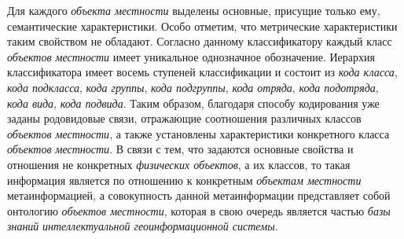 Для каждого \textit{объекта местности} выделены основные, присущие только ему, семантические характеристики. Особо отметим, что метрические характеристики таким свойством не обладают.  
Согласно данному классификатору каждый класс \textit{объектов местности} имеет уникальное однозначное обозначение. Иерархия классификатора имеет восемь ступеней классификации и состоит из \textit{кода класса}, \textit{кода подкласса}, \textit{кода группы}, \textit{кода подгруппы}, \textit{кода отряда}, \textit{кода подотряда}, \textit{кода вида}, \textit{кода подвида}. Таким образом, благодаря способу кодирования уже заданы родовидовые связи, отражающие соотношения различных классов \textit{объектов местности}, а также установлены характеристики конкретного класса \textit{объектов местности}. В связи с тем, что задаются основные свойства и отношения не конкретных \textit{физических объектов}, а их классов, то такая информация является по отношению к конкретным \textit{объектам местности} метаинформацией, а совокупность данной метаинформации представляет собой онтологию \textit{объектов местности}, которая в свою очередь является частью \textit{базы знаний} \textit{интеллектуальной геоинформационной системы}.

